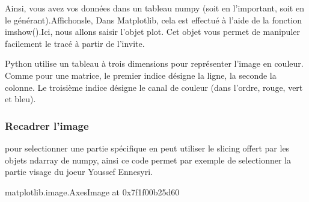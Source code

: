 \documentclass[letterpaper,10pt,english]{jupyterBook}
\begin{document}
\sphinxAtStartPar
Ainsi, vous avez vos données dans un tableau numpy (soit en l’important, soit en le générant).Affichons\sphinxhyphen{}le, Dans Matplotlib, cela est effectué à l’aide de la fonction imshow().Ici, nous allons saisir l’objet plot. Cet objet vous permet de manipuler facilement le tracé à partir de l’invite.

\sphinxAtStartPar
Python utilise un tableau à trois dimensions pour représenter l’image en couleur. Comme
pour une matrice, le premier indice désigne la ligne, la seconde la colonne. Le troisième
indice désigne le canal de couleur (dans l’ordre, rouge, vert et bleu).


\subsubsection{Recadrer l’image}
\label{\detokenize{notebooks/images/TRAITEMENT-DES-IMAGES:recadrer-l-image}}
\sphinxAtStartPar
pour selectionner une partie spécifique en peut utiliser le slicing offert par les objets ndarray de numpy, ainsi ce code permet par exemple de selectionner la partie visage du joeur Youssef En\sphinxhyphen{}nesyri.
\begin{sphinxVerbatimInput}

\begin{sphinxVerbatim}[commandchars=\\\{\}]
\PYG{p}{[}\PYG{p}{]}
\end{sphinxVerbatim}
\end{sphinxVerbatimInput}
\begin{sphinxVerbatimOutput}

\begin{sphinxVerbatim}[commandchars=\\\{\}]
\PYGZlt{}matplotlib.image.AxesImage at 0x7f1f00b25d60\PYGZgt{}
\end{sphinxVerbatim}

\noindent{}
\end{sphinxVerbatimOutput}
\end{document}
